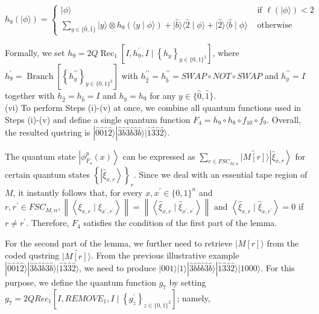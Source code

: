 \documentclass[10pt]{article}
\begin{document}
$$
h_{9}(|\phi\rangle)= \begin{cases}|\phi\rangle & \text { if } \ell(|\phi\rangle)<2 \\ \sum_{y \in\{\hat{0}, \hat{1}\}}|y\rangle \otimes h_{9}(\langle y \mid \phi\rangle)+|\hat{b}\rangle\langle\hat{2} \mid \phi\rangle+|\hat{2}\rangle\langle\hat{b} \mid \phi\rangle & \text { otherwise }\end{cases}
$$

Formally, we set $h_{9}=2 Q \operatorname{Rec}_{1}\left[I, h_{9}^{\prime}, I \mid\left\{h_{y}\right\}_{y \in\{0,1\}^{2}}\right]$, where $h_{9}^{\prime}=\operatorname{Branch}\left[\left\{h_{y}^{\prime \prime}\right\}_{y \in\{0,1\}^{2}}\right]$ with $h_{\hat{2}}^{\prime \prime}=h_{\hat{b}}^{\prime \prime}= S W A P \circ N O T \circ S W A P$ and $h_{y}^{\prime \prime}=I$ together with $h_{\hat{2}}=h_{\hat{b}}=I$ and $h_{y}=h_{9}$ for any $y \in\{\hat{0}, \hat{1}\}$.\\
(vi) To perform Steps (i)-(v) at once, we combine all quantum functions used in Steps (i)-(v) and define a single quantum function $F_{4}=h_{9} \circ h_{8} \circ f_{10} \circ f_{9}$. Overall, the resulted qustring is $|\hat{0} \hat{0} \hat{1} \hat{2}\rangle|\hat{3} \hat{b} \hat{3} \hat{b} \hat{3} \hat{b}\rangle|\hat{1} \hat{3} \hat{3} \hat{2}\rangle$.

The quantum state $\left|\phi_{F_{4}}^{p}(x)\right\rangle$ can be expressed as $\sum_{r \in F S C_{M, n}}|\widetilde{M[r]}\rangle\left|\widehat{\xi}_{x, r}\right\rangle$ for certain quantum states $\left\{\left|\widehat{\xi}_{x, r}\right\rangle\right\}_{r}$. Since we deal with an essential tape region of $M$, it instantly follows that, for every $x, x^{\prime} \in\{0,1\}^{n}$ and $r, r^{\prime} \in F S C_{M, n},\left\|\left\langle\xi_{x, r} \mid \xi_{x^{\prime}, r^{\prime}}\right\rangle\right\|=\left\|\left\langle\widehat{\xi}_{x, r} \mid \widehat{\xi}_{x^{\prime}, r^{\prime}}\right\rangle\right\|$ and $\left\langle\hat{\xi}_{x, r} \mid \hat{\xi}_{x, r^{\prime}}\right\rangle=0$ if $r \neq r^{\prime}$. Therefore, $F_{4}$ satisfies the condition of the first part of the lemma.

For the second part of the lemma, we further need to retrieve $|M[r]\rangle$ from the coded qustring $\mid \widetilde{M[r]\rangle}$. From the previous illustrative example $|\hat{0} \hat{0} \hat{1} \hat{2}\rangle|\hat{3} \hat{b} \hat{3} \hat{b} \hat{3} \hat{b}\rangle|\hat{1} \hat{3} \hat{3} \hat{2}\rangle$, we need to produce $|001\rangle|1\rangle|\hat{3} \hat{b} \hat{b} \hat{b} \hat{3} \hat{b}\rangle|\hat{1} \hat{3} \hat{3} \hat{2}\rangle|1000\rangle$. For this purpose, we define the quantum function $g_{7}$ by setting $g_{7}=2 Q R e c_{1}\left[I, R E M O V E_{1}, I \mid\left\{g_{z}^{\prime}\right\}_{z \in\{0,1\}^{2}}\right]$; namely,
\end{document}
